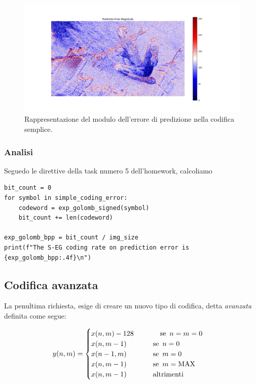 \begin{figure}[h]
    \centering
    \includegraphics[width = .9\textwidth]{hw-1/report/imgs/simple-coding.png}
    \caption{Rappresentazione del modulo dell'errore di predizione nella codifica semplice.}
    \label{fig:simple-coding}
\end{figure}







\subsubsection{Analisi} 
Seguedo le direttive della task numero 5 dell'homework, calcoliamo 

\begin{lstlisting}
bit_count = 0
for symbol in simple_coding_error:
    codeword = exp_golomb_signed(symbol)
    bit_count += len(codeword)

exp_golomb_bpp = bit_count / img_size
print(f"The S-EG coding rate on prediction error is {exp_golomb_bpp:.4f}\n")    
\end{lstlisting}



\vspace{15px}\subsection{Codifica avanzata}

La penultima richiesta, esige di creare un nuovo tipo di codifica, detta \textsl{avanzata} definita come segue:

\begin{gather*}
    y(n, m) = 
    \begin{cases}
        x(n, m) - 128 \hspace{37px} \text{se } \, n = m = 0 \\
        x(n, m - 1) \hspace{37px} \text{se } \, n = 0\\
        x(n - 1, m) \hspace{37px} \text{se } \, m = 0\\
        x(n, m - 1) \hspace{37px} \text{se } \, m = \text{MAX}\\
        x(n, m - 1) \hspace{37px} \text{altrimenti}
    \end{cases}
\end{gather*} 

